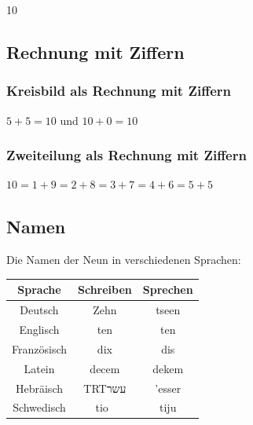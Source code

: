 \documentclass[a4paper]{amsart}
\newcommand{\texthebrew}[1]{\bgroup\textdir TRT\hebrewfont #1\egroup}
\theoremstyle{definition}
\begin{document}
{\Huge 10}

\subsection{Rechnung mit Ziffern}

\subsubsection{Kreisbild als Rechnung mit Ziffern}
$5 + 5 = 10$ und $10 + 0 = 10$
\subsubsection{Zweiteilung als Rechnung mit Ziffern}
$10 = 1 + 9 = 2 + 8 = 3 + 7 = 4 + 6 = 5 + 5$

\subsection{Namen}
Die Namen der Neun in verschiedenen Sprachen:
\vspace{\kategoryVspace}

\begin{tabular}{|c|c|c|}
   \hline
   \textbf{Sprache}& \textbf{Schreiben} & \textbf{Sprechen} \\
   \hline
   Deutsch     &Zehn   &tseen      \\
   \hline
   Englisch    &ten   &ten      \\
   \hline
   Französisch &dix   &dis      \\
   \hline
   Latein      &decem  &dekem     \\
   \hline
   Hebräisch   &\texthebrew{עשר}    &'esser \\
   \hline
   Schwedisch  &tio    &tiju     \\
   \hline
\end{tabular}
\end{document}
